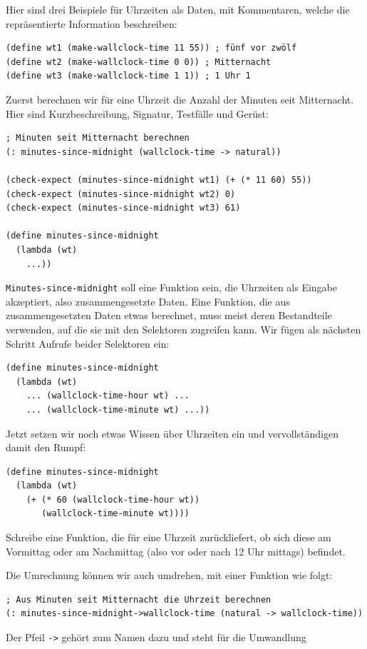 Hier sind drei Beispiele für Uhrzeiten als Daten, mit Kommentaren,
welche die repräsentierte Information beschreiben:
%
\begin{verbatim}
(define wt1 (make-wallclock-time 11 55)) ; fünf vor zwölf
(define wt2 (make-wallclock-time 0 0)) ; Mitternacht
(define wt3 (make-wallclock-time 1 1)) ; 1 Uhr 1
\end{verbatim}
%
Zuerst berechnen wir für eine Uhrzeit die Anzahl der Minuten
seit Mitternacht.  Hier sind Kurzbeschreibung, Signatur, Testfälle und Gerüst:
%
\begin{verbatim}
; Minuten seit Mitternacht berechnen
(: minutes-since-midnight (wallclock-time -> natural))

(check-expect (minutes-since-midnight wt1) (+ (* 11 60) 55))
(check-expect (minutes-since-midnight wt2) 0)
(check-expect (minutes-since-midnight wt3) 61)

(define minutes-since-midnight
  (lambda (wt)
    ...))
\end{verbatim}
%
\texttt{Minutes-since-midnight} soll eine Funktion sein, die
Uhrzeiten als Eingabe akzeptiert, also zusammengesetzte Daten.  Eine
Funktion, die aus zusammengesetzten Daten etwas berechnet, muss meist
deren Bestandteile verwenden, auf die sie mit den Selektoren zugreifen
kann.  Wir fügen als nächsten Schritt Aufrufe beider Selektoren ein:
%
\begin{verbatim}
(define minutes-since-midnight
  (lambda (wt)
    ... (wallclock-time-hour wt) ...
    ... (wallclock-time-minute wt) ...))
\end{verbatim}
%
Jetzt setzen wir noch etwas Wissen über Uhrzeiten ein und
vervollständigen damit den Rumpf:
%
\begin{verbatim}
(define minutes-since-midnight
  (lambda (wt)
    (+ (* 60 (wallclock-time-hour wt))
       (wallclock-time-minute wt))))
\end{verbatim}
%
\begin{aufgabeinline}
  Schreibe eine Funktion, die für eine Uhrzeit zurückliefert, ob sich
  diese am Vormittag oder am Nachmittag (also vor oder nach 12 Uhr
  mittags) befindet.
\end{aufgabeinline}
%
Die Umrechnung können wir auch umdrehen, mit einer Funktion wie folgt:
%
\begin{verbatim}
; Aus Minuten seit Mitternacht die Uhrzeit berechnen
(: minutes-since-midnight->wallclock-time (natural -> wallclock-time))
\end{verbatim}
%
Der Pfeil \verb|->| gehört zum Namen dazu und steht für die Umwandlung
